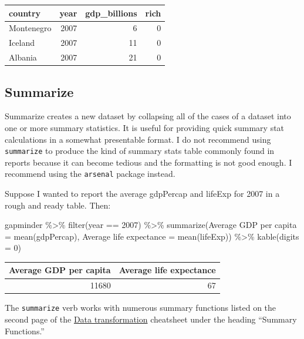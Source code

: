 \documentclass[
]{book}
\makeatletter
\newenvironment{Shaded}{\begin{snugshade}}{\end{snugshade}}
\newcommand{\AttributeTok}[1]{\textcolor[rgb]{0.61,0.61,0.61}{#1}}
\newcommand{\DecValTok}[1]{\textcolor[rgb]{0.06,0.06,0.06}{#1}}
\newcommand{\FunctionTok}[1]{\textcolor[rgb]{0,0,0}{#1}}
\newcommand{\NormalTok}[1]{#1}
\newcommand{\OtherTok}[1]{\textcolor[rgb]{0.37,0.37,0.37}{#1}}
\newcommand{\SpecialCharTok}[1]{\textcolor[rgb]{0,0,0}{#1}}
\newcommand{\StringTok}[1]{\textcolor[rgb]{0.5,0.5,0.5}{#1}}
\newenvironment{kframe}{%
\medskip{}
\setlength{\fboxsep}{.8em}
 \def\at@end@of@kframe{}%
 \ifinner\ifhmode%
  \def\at@end@of@kframe{\end{minipage}}%
  \begin{minipage}{\columnwidth}%
 \fi\fi%
 \def\FrameCommand##1{\hskip\@totalleftmargin \hskip-\fboxsep
 \colorbox{shadecolor}{##1}\hskip-\fboxsep
     \hskip-\linewidth \hskip-\@totalleftmargin \hskip\columnwidth}%
 \MakeFramed {\advance\hsize-\width
   \@totalleftmargin\z@ \linewidth\hsize
   \@setminipage}}%
 {\par\unskip\endMakeFramed%
 \at@end@of@kframe}
\renewenvironment{Shaded}{\begin{kframe}}{\end{kframe}}
\makeatother
\begin{document}
\begin{tabular}{l|r|r|r}
\hline
country & year & gdp\_billions & rich\\
\hline
Montenegro & 2007 & 6 & 0\\
\hline
Iceland & 2007 & 11 & 0\\
\hline
Albania & 2007 & 21 & 0\\
\hline
\end{tabular}

\hypertarget{summarize}{%
\subsection{Summarize}\label{summarize}}

Summarize creates a new dataset by collapsing all of the cases of a dataset into one or more summary statistics. It is useful for providing quick summary stat calculations in a somewhat presentable format. I do not recommend using \texttt{summarize} to produce the kind of summary stats table commonly found in reports because it can become tedious and the formatting is not good enough. I recommend using the \texttt{arsenal} package instead.

Suppose I wanted to report the average gdpPercap and lifeExp for 2007 in a rough and ready table. Then:

\begin{Shaded}
\begin{Highlighting}[]
\NormalTok{gapminder }\SpecialCharTok{\%\textgreater{}\%} 
  \FunctionTok{filter}\NormalTok{(year }\SpecialCharTok{==} \DecValTok{2007}\NormalTok{) }\SpecialCharTok{\%\textgreater{}\%} 
  \FunctionTok{summarize}\NormalTok{(}\StringTok{\textquotesingle{}Average GDP per capita\textquotesingle{}} \OtherTok{=} \FunctionTok{mean}\NormalTok{(gdpPercap), }
            \StringTok{\textquotesingle{}Average life expectance\textquotesingle{}} \OtherTok{=} \FunctionTok{mean}\NormalTok{(lifeExp)) }\SpecialCharTok{\%\textgreater{}\%} 
  \FunctionTok{kable}\NormalTok{(}\AttributeTok{digits =} \DecValTok{0}\NormalTok{)}
\end{Highlighting}
\end{Shaded}

\begin{tabular}{r|r}
\hline
Average GDP per capita & Average life expectance\\
\hline
11680 & 67\\
\hline
\end{tabular}

The \texttt{summarize} verb works with numerous summary functions listed on the second page of the \href{https://github.com/rstudio/cheatsheets/raw/master/data-transformation.pdf}{Data transformation} cheatsheet under the heading ``Summary Functions.''
\end{document}
